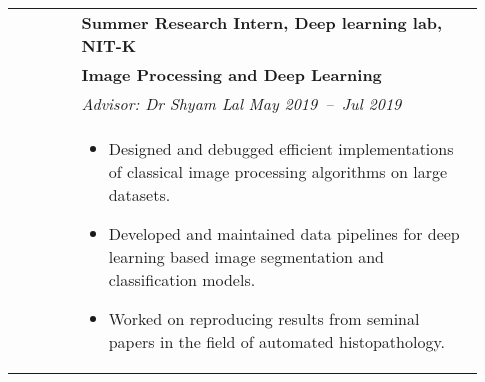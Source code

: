 \documentclass[letterpaper, 10pt, oneside]{article}
\newcommand{\bdit}[1]{{\textbf{#1}}}
\begin{document}
\begin{longtable}{@{} p{0.13\linewidth} p{0.8\linewidth}}
                         & \bdit{Summer Research Intern, Deep learning lab, NIT-K}                                                                                                                                                           \\
                         & \bdit{Image Processing and Deep Learning}                                                                                                                                                                         \\
                         & \textsl{Advisor: Dr Shyam Lal} \hfill \hspace{-3em} \textsl{May 2019\ --\ Jul 2019}                                                                                                                               \\
                         & \parbox{0.8\textwidth}{                                                                                                                                                                                           %
        \begin{itemize}[leftmargin=*, itemsep=-0.88ex, topsep=-0.88ex]
            \item Designed and debugged efficient implementations of classical image processing algorithms on large datasets.
            \item Developed and maintained data pipelines for deep learning based image segmentation and classification models.
            \item Worked on reproducing results from seminal papers in the field of automated histopathology.
        \end{itemize}
    }
    \\
    \\


\end{longtable}
\end{document}
